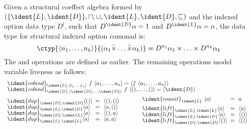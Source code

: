 \begin{example}
Given a structural coeffect algebra formed by $(\{ \ident{L}, \ident{D} \}, \sqcap, \sqcup, \ident{L}, \ident{D}, \sqsubseteq)$
and the indexed option data type $D^l$, such that $D^{\ident{D}}\alpha = 1$ and $D^{\ident{L}}\alpha=\alpha$,
the data type for structural indexed option comonad is:
%
\begin{equation*}
\ctyp{\langle n_1, \ldots, n_k\rangle}{(\alpha_1 \xtimes \ldots \xtimes \alpha_k)} = 
  D^{n_1} \alpha_1 \times \ldots \times D^{n_k} \alpha_k
\end{equation*}
%
The  and  operations are defined as earlier. The remaining operations
model variable liveness as follows:
%
\begin{equation*}
\begin{array}{l}
\ident{cobind}_{\ident{L}, \langle l_1, \ldots, l_n \rangle}~f~\langle a_1, \ldots, a_n \rangle = \langle f~\langle a_1, \ldots, a_n \rangle \rangle \\[-0.25em]
\ident{cobind}_{\ident{D}, \langle \ident{D}, \ldots, \ident{D} \rangle}~f~\langle (), \ldots, () \rangle = \langle \ident{D} \rangle
\\[0.5em]
\hspace{-0.5em}
\begin{array}{lll}
~\\[-0.85em]
\ident{dup}_{\ident{D}, \ident{D}} \langle () \rangle &\narrow{=}& \langle (), () \rangle \\[-0.25em]
\ident{dup}_{\ident{L}, \ident{D}} \langle a \rangle &\narrow{=}& \langle a, () \rangle \\[-0.25em]
\ident{dup}_{\ident{D}, \ident{L}} \langle a \rangle &\narrow{=}& \langle (), a \rangle \\[-0.25em]
\ident{dup}_{\ident{L}, \ident{L}} \langle a \rangle &\narrow{=}& \langle a, a \rangle 
\end{array}
\qquad\quad
\begin{array}{lll}
\ident{counit}_{\ident{L}}~\langle a \rangle &\narrow{=}& a
\\[0.45em]
\ident{lift}_{\ident{L}, \ident{L}} \langle a \rangle &\narrow{=}& \langle a \rangle \\[-0.25em]
\ident{lift}_{\ident{L}, \ident{D}} \langle a \rangle &\narrow{=}& \langle () \rangle \\[-0.25em]
\ident{lift}_{\ident{D}, \ident{D}} \langle () \rangle &\narrow{=}& \langle () \rangle \\[-0.25em]
\end{array}
\end{array}
\end{equation*}
\end{example}

